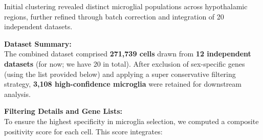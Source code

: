 \documentclass[
  letterpaper,
  DIV=11,
  numbers=noendperiod]{scrartcl}
\begin{document}
Initial clustering revealed distinct microglial populations across
hypothalamic regions, further refined through batch correction and
integration of 20 independent datasets.

\textbf{Dataset Summary:}\\
The combined dataset comprised \textbf{271,739 cells} drawn from
\textbf{12 independent datasets} (for now; we have 20 in total). After
exclusion of sex-specific genes (using the list provided below) and
applying a super conservative filtering strategy, \textbf{3,108
high-confidence microglia} were retained for downstream analysis.

\textbf{Filtering Details and Gene Lists:}\\
To ensure the highest specificity in microglia selection, we computed a
composite positivity score for each cell. This score integrates:
\end{document}
